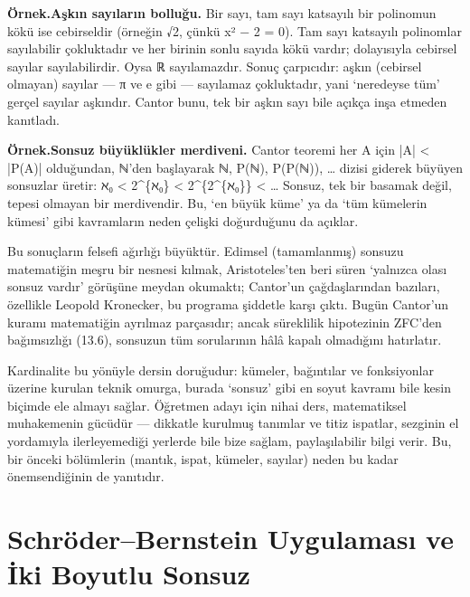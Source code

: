 \begin{tcolorbox}[bookbox,colback=cEx]\textbf{\textsf{\textcolor{cAcc}{Örnek.}}}\quad \textbf{Aşkın sayıların bolluğu. }Bir sayı, tam sayı katsayılı bir polinomun kökü ise cebirseldir (örneğin √2, çünkü x² − 2 = 0). Tam sayı katsayılı polinomlar sayılabilir çokluktadır ve her birinin sonlu sayıda kökü vardır; dolayısıyla cebirsel sayılar sayılabilirdir. Oysa ℝ sayılamazdır. Sonuç çarpıcıdır: aşkın (cebirsel olmayan) sayılar — π ve e gibi — sayılamaz çokluktadır, yani ‘neredeyse tüm’ gerçel sayılar aşkındır. Cantor bunu, tek bir aşkın sayı bile açıkça inşa etmeden kanıtladı.\end{tcolorbox}

\begin{tcolorbox}[bookbox,colback=cEx]\textbf{\textsf{\textcolor{cAcc}{Örnek.}}}\quad \textbf{Sonsuz büyüklükler merdiveni. }Cantor teoremi her A için |A| < |P(A)| olduğundan, ℕ’den başlayarak ℕ, P(ℕ), P(P(ℕ)), … dizisi giderek büyüyen sonsuzlar üretir: ℵ₀ < 2\textasciicircum{}\{ℵ₀\} < 2\textasciicircum{}\{2\textasciicircum{}\{ℵ₀\}\} < … Sonsuz, tek bir basamak değil, tepesi olmayan bir merdivendir. Bu, ‘en büyük küme’ ya da ‘tüm kümelerin kümesi’ gibi kavramların neden çelişki doğurduğunu da açıklar.\end{tcolorbox}

Bu sonuçların felsefi ağırlığı büyüktür. Edimsel (tamamlanmış) sonsuzu matematiğin meşru bir nesnesi kılmak, Aristoteles’ten beri süren ‘yalnızca olası sonsuz vardır’ görüşüne meydan okumaktı; Cantor’un çağdaşlarından bazıları, özellikle Leopold Kronecker, bu programa şiddetle karşı çıktı. Bugün Cantor’un kuramı matematiğin ayrılmaz parçasıdır; ancak süreklilik hipotezinin ZFC’den bağımsızlığı (13.6), sonsuzun tüm sorularının hâlâ kapalı olmadığını hatırlatır.

Kardinalite bu yönüyle dersin doruğudur: kümeler, bağıntılar ve fonksiyonlar üzerine kurulan teknik omurga, burada ‘sonsuz’ gibi en soyut kavramı bile kesin biçimde ele almayı sağlar. Öğretmen adayı için nihai ders, matematiksel muhakemenin gücüdür — dikkatle kurulmuş tanımlar ve titiz ispatlar, sezginin el yordamıyla ilerleyemediği yerlerde bile bize sağlam, paylaşılabilir bilgi verir. Bu, bir önceki bölümlerin (mantık, ispat, kümeler, sayılar) neden bu kadar önemsendiğinin de yanıtıdır.

\section{Schröder–Bernstein Uygulaması ve İki Boyutlu Sonsuz}

